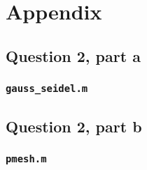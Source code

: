 \documentclass[10pt]{article}
\begin{document}
\begin{comment}
\begin{figure}[H]
\centering
\texttt{[image: figures/errors\_raw.jpg]}
\caption{\(L^2\) norm as a function of the number of nodes.}
\label{fig:errors_raw}
\end{figure}
\end{comment}









\section{Appendix}
\subsection{Question 2, part a}
\subsubsection{{\tt gauss\_seidel.m}}

\subsection{Question 2, part b}
\subsubsection{{\tt pmesh.m}}

\end{document}
